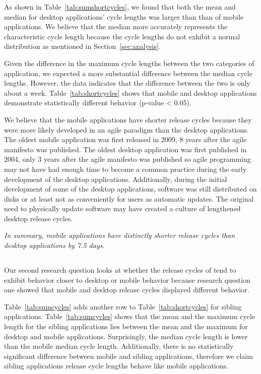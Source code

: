 \documentclass{acm_proc_article-sp}
\begin{document}
As shown in Table~\ref{tab:sumshortcycles}, we found that both the mean and median for desktop applications' cycle lengths was larger than than of mobile applications. 
We believe that the median more accurately represents the characteristic cycle length because the cycle lengths do not exhibit a normal distribution as mentioned in Section~\ref{sec:analysis}. 

Given the difference in the maximum cycle lengths between the two categories of application, we expected a more substantial difference between the median cycle lengths.
However, the data indicates that the difference between the two is only about a week.
Table~\ref{tab:shortcycles} shows that mobile and desktop applications demonstrate statistically different behavior (p-value < 0.05).

We believe that the mobile applications have shorter release cycles because they were more likely developed in an agile paradigm than the desktop applications. 
The oldest mobile application was first released in 2009, 8 years after the agile manifesto was published. 
The oldest desktop application was first published in 2004, only 3 years after the agile manifesto was published so agile programming may not have had enough time to become a common practice during the early development of the desktop applications.
Additionally, during the initial development of some of the desktop applications, software was still distributed on disks or at least not as conveniently for users as automatic updates. 
The original need to physically update software may have created a culture of lengthened desktop release cycles.



\textit{In summary, mobile applications have distinctly shorter release cycles than desktop applications by 7.5 days.}


\subsection{\RQTwo }
Our second research question looks at whether the release cycles of \sibs tend to exhibit behavior closer to desktop or mobile behavior because research question one showed that mobile and desktop release cycles displayed different behavior.

Table~\ref{tab:sumcycles} adds another row to Table~\ref{tab:shortcycles} for sibling applications. 
Table~\ref{tab:sumcycles} shows that the mean and the maximum cycle length for the sibling applications lies between the mean and the maximum for desktop and mobile applications. 
Surprisingly, the median cycle length is lower than the mobile median cycle length. 
Additionally, there is no statistically significant difference between mobile and sibling applications, therefore we claim sibling applications release cycle lengths behave like mobile applications.
\end{document}
